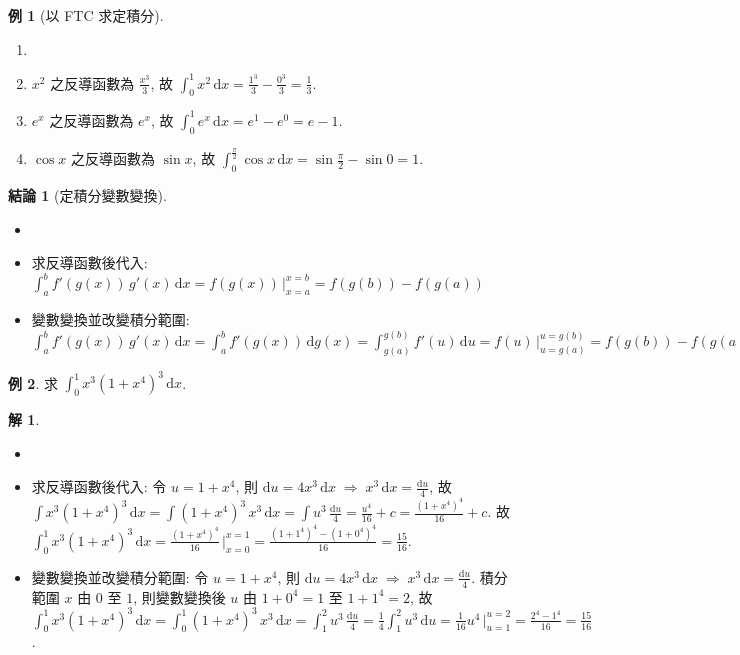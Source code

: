 \documentclass[12pt]{extarticle}
\newcommand{\ds}{\displaystyle}
\newcommand{\ie}{\;\Longrightarrow\;}
\theoremstyle{definition}
\newtheorem*{fact}{結論}
\newtheorem*{ex}{例}
\newtheorem*{sol}{解}
\begin{document}
\begin{ex}[以 FTC 求定積分]
  \begin{enumerate}\setlength{\itemsep}{0pt}
    \item[]
    \item $\ds x^2$ 之反導函數為 $\ds\frac{x^3}{3}$, 故 $\ds\int_0^1 x^2\,\text{d}x = \frac{1^3}{3} - \frac{0^3}{3} = \frac{1}{3}$. 
    \item $\ds e^x$ 之反導函數為 $\ds e^x$, 故 $\ds\int_0^1 e^x\,\text{d}x = e^1 - e^0 = e - 1$. 
    \item $\cos x$ 之反導函數為 $\sin x$, 故 $\ds\int_0^{\frac{\pi}{2}}\cos x\,\text{d}x = \sin\frac{\pi}{2} - \sin 0 = 1$. 
  \end{enumerate}
\end{ex}

\begin{fact}[定積分變數變換]
  \begin{itemize}\setlength{\itemsep}{0pt}
    \item[]
    \item 求反導函數後代入: $\ds\int_a^b f'(g(x))\,g'(x)\,\text{d}x = f(g(x))\,\Big|_{x = a}^{x = b} = f(g(b)) - f(g(a))$
    \item 變數變換並改變積分範圍: $\ds\int_a^b f'(g(x))\,g'(x)\,\text{d}x = \int_a^b f'(g(x))\,\text{d}g(x) =\int_{g(a)}^{g(b)} f'(u)\,\text{d}u = f(u)\,\Big|_{u = g(a)}^{u = g(b)} = f(g(b)) - f(g(a))$
  \end{itemize}
\end{fact}

\begin{ex}
  求 $\ds\int_0^1 x^3(1 + x^4)^3\,\text{d}x$. 
\end{ex}

\begin{sol}
  \begin{itemize}\setlength{\itemsep}{0pt}
    \item[]
    \item 求反導函數後代入: 令 $\ds u = 1 + x^4$, 則 $\ds\text{d}u = 4 x^3\,\text{d}x\ie x^3\,\text{d}x = \frac{\text{d}u}{4}$, 故 $\ds\int x^3(1 + x^4)^3\,\text{d}x = \int (1 + x^4)^3\,x^3\,\text{d}x = \int u^3\,\frac{\text{d}u}{4} = \frac{u^4}{16} + c = \frac{(1 + x^4)^4}{16} + c$. 故 $\ds\int_0^1 x^3(1 + x^4)^3\,\text{d}x = \frac{(1 + x^4)^4}{16}\,\Big|_{x = 0}^{x = 1} = \frac{(1 + 1^4)^4 - (1 + 0^4)^4}{16} = \frac{15}{16}$. 
    \item 變數變換並改變積分範圍: 令 $\ds u = 1 + x^4$, 則 $\ds\text{d}u = 4 x^3\,\text{d}x\ie x^3\,\text{d}x = \frac{\text{d}u}{4}$. 積分範圍 $x$ 由 $0$ 至 $1$, 則變數變換後 $u$ 由 $\ds 1 + 0^4 = 1$ 至 $\ds1 + 1^4 = 2$, 故 $\ds\int_0^1 x^3(1 + x^4)^3\,\text{d}x = \int_0^1 (1 + x^4)^3\,x^3\,\text{d}x = \int_1^2 u^3\,\frac{\text{d}u}{4} = \frac{1}{4}\int_1^2 u^3\,\text{d}u = \frac{1}{16} u^4\,\Big|_{u = 1}^{u = 2} = \frac{2^4 - 1^4}{16} = \frac{15}{16}$. 
  \end{itemize}
\end{sol}
\end{document}
